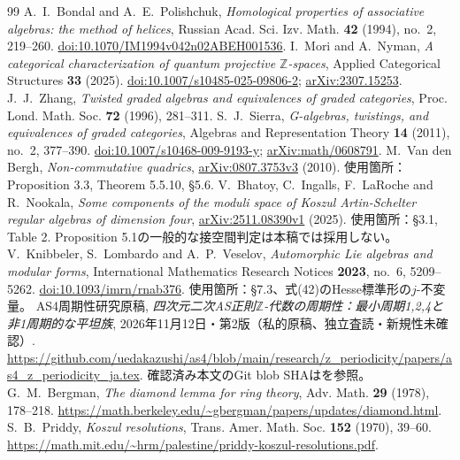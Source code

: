 \documentclass[11pt,a4paper]{ltjsarticle}
\theoremstyle{definition}
\begin{document}
\begin{thebibliography}{99}
 A.~I.~Bondal and A.~E.~Polishchuk,
\emph{Homological properties of associative algebras: the method of helices},
Russian Acad. Sci. Izv. Math. \textbf{42} (1994), no.~2, 219--260.
\href{https://doi.org/10.1070/IM1994v042n02ABEH001536}{doi:10.1070/IM1994v042n02ABEH001536}.
 I.~Mori and A.~Nyman,
\emph{A categorical characterization of quantum projective $\mathbb Z$-spaces},
Applied Categorical Structures \textbf{33} (2025).
\href{https://doi.org/10.1007/s10485-025-09806-2}{doi:10.1007/s10485-025-09806-2};
\href{https://arxiv.org/abs/2307.15253}{arXiv:2307.15253}.
 J.~J.~Zhang,
\emph{Twisted graded algebras and equivalences of graded categories},
Proc. Lond. Math. Soc. \textbf{72} (1996), 281--311.
 S.~J.~Sierra,
\emph{G-algebras, twistings, and equivalences of graded categories},
Algebras and Representation Theory \textbf{14} (2011), no.~2, 377--390.
\href{https://doi.org/10.1007/s10468-009-9193-y}{doi:10.1007/s10468-009-9193-y};
\href{https://arxiv.org/abs/math/0608791}{arXiv:math/0608791}.
 M.~Van den Bergh, \emph{Non-commutative quadrics},
\href{https://arxiv.org/abs/0807.3753v3}{arXiv:0807.3753v3} (2010).
使用箇所：Proposition 3.3, Theorem 5.5.10, \S5.6.
 V.~Bhatoy, C.~Ingalls, F.~LaRoche and R.~Nookala,
\emph{Some components of the moduli space of Koszul Artin-Schelter regular algebras of dimension four},
\href{https://arxiv.org/abs/2511.08390v1}{arXiv:2511.08390v1} (2025).
使用箇所：\S3.1, Table 2. Proposition 5.1の一般的な接空間判定は本稿では採用しない。
V.~Knibbeler, S.~Lombardo and A.~P.~Veselov,
\emph{Automorphic Lie algebras and modular forms},
International Mathematics Research Notices \textbf{2023}, no.~6, 5209--5262.
\href{https://doi.org/10.1093/imrn/rnab376}{doi:10.1093/imrn/rnab376}.
使用箇所：\S7.3、式(42)のHesse標準形の$j$-不変量。
 AS4周期性研究原稿,
\emph{四次元二次AS正則$\mathbb Z$-代数の周期性：最小周期1,2,4と非1周期的な平坦族},
2026年11月12日・第2版（私的原稿、独立査読・新規性未確認）.
\url{https://github.com/uedakazushi/as4/blob/main/research/z_periodicity/papers/as4_z_periodicity_ja.tex}.
確認済み本文のGit blob SHAはを参照。
G.~M.~Bergman, \emph{The diamond lemma for ring theory},
Adv. Math. \textbf{29} (1978), 178--218.
\url{https://math.berkeley.edu/~gbergman/papers/updates/diamond.html}.
S.~B.~Priddy, \emph{Koszul resolutions}, Trans. Amer. Math. Soc.
\textbf{152} (1970), 39--60.
\url{https://math.mit.edu/~hrm/palestine/priddy-koszul-resolutions.pdf}.

\end{thebibliography}
\end{document}

